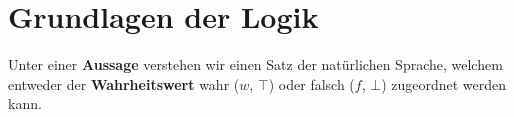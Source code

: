 \documentclass[../../main.tex]{subfiles}
\begin{document}

	
	\chapter{Grundlagen der Logik}
	
	\begin{definition}
		\label{def:Aussage}
		\label{def:Wahrheitswert}
		Unter einer \textbf{Aussage} verstehen wir einen Satz der natürlichen Sprache, welchem entweder der \textbf{Wahrheitswert} wahr ($w$, $\top$) oder falsch ($f$, $\bot$) zugeordnet werden kann.
	\end{definition}
	
\end{document}
